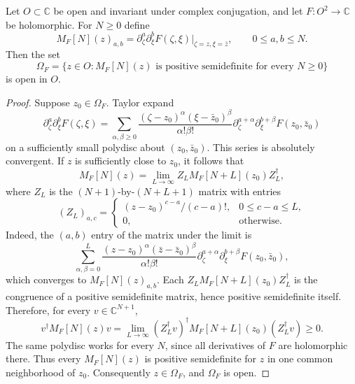 \documentclass[11pt, letterpaper, reqno]{amsart}
\theoremstyle{definition}
\newenvironment{theorem}
{\pushQED{\qed}\renewcommand{\qedsymbol}{$\blacksquare\square$}\theoremxx}
{\popQED\endtheoremxx}
\theoremstyle{remark}
\newcommand{\bbC}{\mathbb{C}}
\begin{document}
\begin{theorem}\label{thm:analytic-open}
Let $O\subset\bbC$ be open and invariant under complex conjugation,
and let $F:O^2\to\bbC$ be holomorphic. For $N\geq0$ define
\begin{equation}
 M_F[N](z)_{a,b}
 =\partial_\zeta^a\partial_\xi^bF(\zeta,\xi)
      \Big|_{\zeta=z,\xi=\bar z},\qquad0\leq a,b\leq N.
\end{equation}
Then the set
\begin{equation}
 \Omega_F=\{z\in O:M_F[N](z)\text{ is positive semidefinite
 for every }N\geq0\}
\end{equation}
is open in $O$.
\end{theorem}
\begin{proof}
Suppose $z_0\in\Omega_F$. Taylor expand
\begin{equation}
 \partial_\zeta^a\partial_\xi^bF(\zeta,\xi)
 =\sum_{\alpha,\beta\geq0}
 \frac{(\zeta-z_0)^\alpha(\xi-\bar z_0)^\beta}{\alpha!\beta!}
 \partial_\zeta^{a+\alpha}\partial_\xi^{b+\beta}F(z_0,\bar z_0)
\end{equation}
on a sufficiently small polydisc about $(z_0,\bar z_0)$.
This series is absolutely convergent. If $z$ is sufficiently close
to $z_0$, it follows that
\begin{equation}\label{eq:Taylor-matrices}
 M_F[N](z)=\lim_{L\to\infty}Z_LM_F[N+L](z_0)Z_L^\dagger,
\end{equation}
where $Z_L$ is the $(N+1)$-by-$(N+L+1)$ matrix with entries
\begin{equation}
 (Z_L)_{a,c}=\begin{cases}
 (z-z_0)^{c-a}/(c-a)!,&0\leq c-a\leq L,\\
 0,&\text{otherwise}.
 \end{cases}
\end{equation}
Indeed, the $(a,b)$ entry of the matrix under the limit is
\begin{equation}
 \sum_{\alpha,\beta=0}^L
 \frac{(z-z_0)^\alpha(\bar z-\bar z_0)^\beta}{\alpha!\beta!}
 \partial_\zeta^{a+\alpha}\partial_\xi^{b+\beta}F(z_0,\bar z_0),
\end{equation}
which converges to $M_F[N](z)_{a,b}$.
Each $Z_LM_F[N+L](z_0)Z_L^\dagger$ is the congruence of a positive
semidefinite matrix, hence positive semidefinite itself. Therefore,
for every $v\in\bbC^{N+1}$,
\begin{equation}
 v^\dagger M_F[N](z)v
 =\lim_{L\to\infty}(Z_L^\dagger v)^\dagger
       M_F[N+L](z_0)(Z_L^\dagger v)\geq0.
\end{equation}
The same polydisc works for every $N$, since all derivatives of $F$
are holomorphic there. Thus every $M_F[N](z)$ is positive
semidefinite for $z$ in one common neighborhood of $z_0$.
Consequently $z\in\Omega_F$, and $\Omega_F$ is open.
\end{proof}
\end{document}
